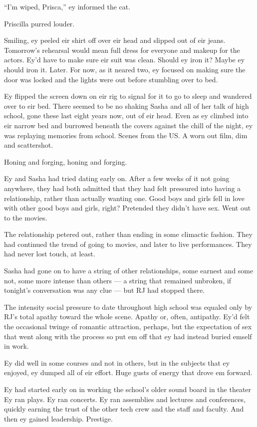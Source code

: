 ``I'm wiped, Prisca,'' ey informed the cat.

Priscilla purred louder.

Smiling, ey peeled eir shirt off over eir head and slipped out of eir jeans. Tomorrow's rehearsal would mean full dress for everyone and makeup for the actors. Ey'd have to make sure eir suit was clean. Should ey iron it? Maybe ey should iron it. Later. For now, as it neared two, ey focused on making sure the door was locked and the lights were out before stumbling over to bed.

Ey flipped the screen down on eir rig to signal for it to go to sleep and wandered over to eir bed. There seemed to be no shaking Sasha and all of her talk of high school, gone these last eight years now, out of eir head. Even as ey climbed into eir narrow bed and burrowed beneath the covers against the chill of the night, ey was replaying memories from school. Scenes from the US. A worn out film, dim and scattershot.

Honing and forging, honing and forging.

Ey and Sasha had tried dating early on. After a few weeks of it not going anywhere, they had both admitted that they had felt pressured into having a relationship, rather than actually wanting one. Good boys and girls fell in love with other good boys and girls, right? Pretended they didn't have sex. Went out to the movies.

The relationship petered out, rather than ending in some climactic fashion. They had continued the trend of going to movies, and later to live performances. They had never lost touch, at least.

Sasha had gone on to have a string of other relationships, some earnest and some not, some more intense than others --- a string that remained unbroken, if tonight's conversation was any clue --- but RJ had stopped there.

The intensity social pressure to date throughout high school was equaled only by RJ's total apathy toward the whole scene. Apathy or, often, antipathy. Ey'd felt the occasional twinge of romantic attraction, perhaps, but the expectation of sex that went along with the process so put em off that ey had instead buried emself in work.

Ey did well in some courses and not in others, but in the subjects that ey enjoyed, ey dumped all of eir effort. Huge gusts of energy that drove em forward.

Ey had started early on in working the school's older sound board in the theater Ey ran plays. Ey ran concerts. Ey ran assemblies and lectures and conferences, quickly earning the trust of the other tech crew and the staff and faculty. And then ey gained leadership. Prestige.

